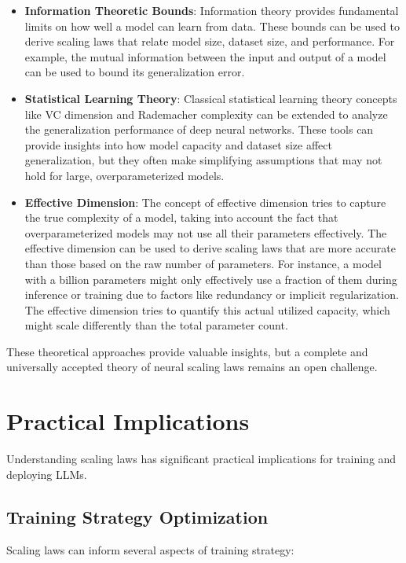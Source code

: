 \begin{itemize}[noitemsep]
    \item \textbf{Information Theoretic Bounds}:  Information theory provides fundamental limits on how well a model can learn from data. These bounds can be used to derive scaling laws that relate model size, dataset size, and performance. For example, the mutual information between the input and output of a model can be used to bound its generalization error.
    \item \textbf{Statistical Learning Theory}:  Classical statistical learning theory concepts like VC dimension and Rademacher complexity can be extended to analyze the generalization performance of deep neural networks. These tools can provide insights into how model capacity and dataset size affect generalization, but they often make simplifying assumptions that may not hold for large, overparameterized models.
    \item \textbf{Effective Dimension}:  The concept of effective dimension tries to capture the true complexity of a model, taking into account the fact that overparameterized models may not use all their parameters effectively. The effective dimension can be used to derive scaling laws that are more accurate than those based on the raw number of parameters.  For instance, a model with a billion parameters might only effectively use a fraction of them during inference or training due to factors like redundancy or implicit regularization. The effective dimension tries to quantify this actual utilized capacity, which might scale differently than the total parameter count.
\end{itemize}

These theoretical approaches provide valuable insights, but a complete and universally accepted theory of neural scaling laws remains an open challenge.

\section{Practical Implications}
\label{sec:practical_implications}

Understanding scaling laws has significant practical implications for training and deploying LLMs.

\subsection{Training Strategy Optimization}
\noindent
Scaling laws can inform several aspects of training strategy:

